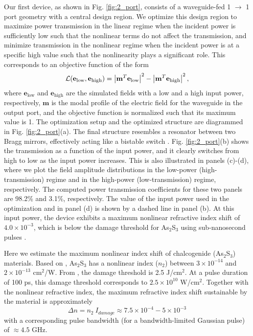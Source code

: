 Our first device, as shown in Fig. \ref{fig:2_port}, consists of a waveguide-fed 1 $\to$ 1 port geometry with a central design region.  We optimize this design region to maximize power transmission in the linear regime when the incident power is sufficiently low such that the nonlinear terms do not affect the transmission, and minimize transmission in the nonlinear regime when the incident power is at a specific high value such that the nonlinearity plays a significant role.  This corresponds to an objective function of the form
%
\begin{equation}
    \mathcal{L}(\mathbf{e}_{\textrm{low}}, \mathbf{e}_{\textrm{high}}) = \left|\mathbf{m}^T \mathbf{e}_{\textrm{low}}\right|^2 - \left|\mathbf{m}^T \mathbf{e}_{\textrm{high}}\right|^2,
\end{equation}
%
where $\mathbf{e}_{\mathrm{low}}$ and $\mathbf{e}_{\mathrm{high}}$ are the simulated fields with a low and a high input power, respectively, $\mathbf{m}$ is the modal profile of the electric field for the waveguide in the output port, and the objective function is normalized such that its maximum value is 1.  The optimization setup and the optimized structure are diagrammed in Fig. \ref{fig:2_port}(a). The final structure resembles a resonator between two Bragg mirrors, effectively acting like a bistable switch \cite{soljacic2002optimal, yanik_all-optical_2003}. Fig. \ref{fig:2_port}(b) shows the transmission as a function of the input power, and it clearly switches from high to low as the input power increases. This is also illustrated in panels (c)-(d), where we plot the field amplitude distributions in the low-power (high-transmission) regime and in the high-power (low-transmission) regime, respectively. The computed power transmission coefficients for these two panels are 98.2\% and 3.1\%, respectively. The value of the input power used in the optimization and in panel (d) is shown by a dashed line in panel (b). At this input power, the device exhibits a maximum nonlinear refractive index shift of $4.0 \times 10^{-3}$, which is below the damage threshold for As$_2$S$_3$ using sub-nanosecond pulses \cite{chorel2018robust}.

Here we estimate the maximum nonlinear index shift of chalcogenide (As$_2$S$_3$) materials.  Based on \cite{Boyd__2008, Lamont_OptExpress_2008, White_OptLett_2011}, As$_2$S$_3$ has a nonlinear index ($n_2$) between $3 \times 10^{-14}$ and $2 \times 10^{-13}$ cm$^2$/W.
From \cite{chorel2018robust}, the damage threshold is 2.5 J/cm$^2$.  At a pulse duration of 100 ps, this damage threshold corresponds to $2.5 \times 10^{10}$ W/cm$^2$.  Together with the nonlinear refractive index, the maximum refractive index shift sustainable by the material is approximately
\begin{equation}
\Delta n = n_2~I_{damage} \approx 7.5\times10^{-4} - 5\times10^{-3}
\end{equation}
with a corresponding pulse bandwidth (for a bandwidth-limited Gaussian pulse) of $\approx 4.5$ GHz.  



